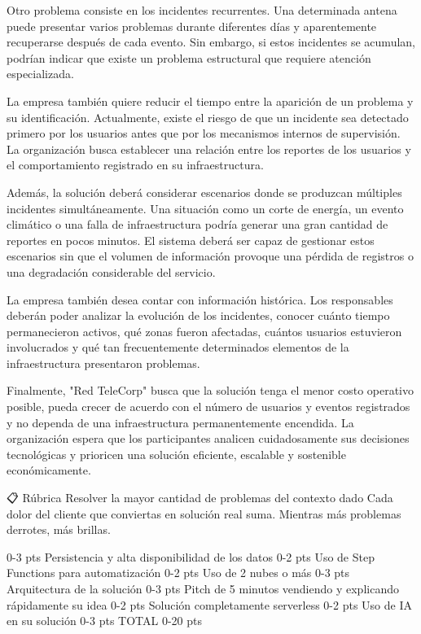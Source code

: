 Otro problema consiste en los incidentes recurrentes. Una determinada antena puede presentar varios problemas durante diferentes días y aparentemente recuperarse después de cada evento. Sin embargo, si estos incidentes se acumulan, podrían indicar que existe un problema estructural que requiere atención especializada.

La empresa también quiere reducir el tiempo entre la aparición de un problema y su identificación. Actualmente, existe el riesgo de que un incidente sea detectado primero por los usuarios antes que por los mecanismos internos de supervisión. La organización busca establecer una relación entre los reportes de los usuarios y el comportamiento registrado en su infraestructura.

Además, la solución deberá considerar escenarios donde se produzcan múltiples incidentes simultáneamente. Una situación como un corte de energía, un evento climático o una falla de infraestructura podría generar una gran cantidad de reportes en pocos minutos. El sistema deberá ser capaz de gestionar estos escenarios sin que el volumen de información provoque una pérdida de registros o una degradación considerable del servicio.

La empresa también desea contar con información histórica. Los responsables deberán poder analizar la evolución de los incidentes, conocer cuánto tiempo permanecieron activos, qué zonas fueron afectadas, cuántos usuarios estuvieron involucrados y qué tan frecuentemente determinados elementos de la infraestructura presentaron problemas.

Finalmente, "Red TeleCorp" busca que la solución tenga el menor costo operativo posible, pueda crecer de acuerdo con el número de usuarios y eventos registrados y no dependa de una infraestructura permanentemente encendida. La organización espera que los participantes analicen cuidadosamente sus decisiones tecnológicas y prioricen una solución eficiente, escalable y sostenible económicamente.

📋 Rúbrica
Resolver la mayor cantidad de problemas del contexto dado
Cada dolor del cliente que conviertas en solución real suma. Mientras más problemas derrotes, más brillas.

0-3 pts
Persistencia y alta disponibilidad de los datos
0-2 pts
Uso de Step Functions para automatización
0-2 pts
Uso de 2 nubes o más
0-3 pts
Arquitectura de la solución
0-3 pts
Pitch de 5 minutos vendiendo y explicando rápidamente su idea
0-2 pts
Solución completamente serverless
0-2 pts
Uso de IA en su solución
0-3 pts
TOTAL
0-20 pts

